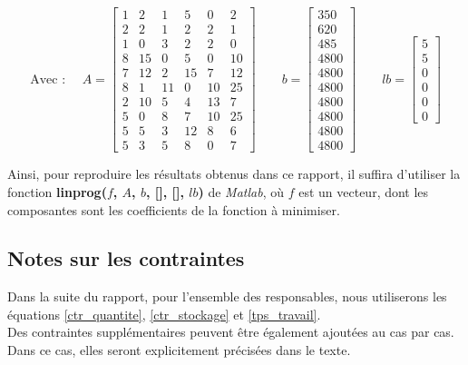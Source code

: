 \documentclass[paper=a4, fontsize=11pt]{report}
\numberwithin{equation}{section}		%
\numberwithin{figure}{section}			%
\numberwithin{table}{section}				%
\renewcommand{\bf}[1]{\textbf{#1}}
\begin{document}
\[ \text{Avec : } \quad A = \begin{bmatrix}
1 & 2 & 1 & 5 & 0 & 2 \\ 
2 & 2 & 1 & 2 & 2 & 1 \\ 
1 & 0 & 3 & 2 & 2 & 0 \\ 
8 & 15 & 0 & 5 & 0 & 10 \\ 
7 & 12 & 2 & 15 & 7 & 12 \\ 
8 & 1 & 11 & 0 & 10 & 25 \\ 
2 & 10 & 5 & 4 & 13 & 7 \\ 
5 & 0 & 8 & 7 & 10 & 25 \\ 
5 & 5 & 3 & 12 & 8 & 6 \\ 
5 & 3 & 5 & 8 & 0 & 7 
\end{bmatrix} \quad \quad
b = \begin{bmatrix}
350 \\ 
620 \\ 
485 \\ 
4800 \\ 
4800 \\ 
4800 \\ 
4800 \\ 
4800 \\ 
4800 \\ 
4800
\end{bmatrix} \quad \quad
lb = \begin{bmatrix}
5 \\
5 \\
0 \\
0 \\
0 \\
0
\end{bmatrix} 
  \]

Ainsi, pour reproduire les résultats obtenus dans ce rapport, il suffira d'utiliser la fonction \bf{linprog($f$, $A$, $b$, [], [], $lb$)} de \textit{Matlab}, où $f$ est un vecteur, dont les composantes sont les coefficients de la fonction à minimiser.

\begin{shaded}
\vspace{-0.5cm}

\subsection*{Notes sur les contraintes}
Dans la suite du rapport, pour l'ensemble des responsables, nous utiliserons les équations \eqref{ctr_quantite}, \eqref{ctr_stockage} et \eqref{tps_travail}. \\

Des contraintes supplémentaires peuvent être également ajoutées au cas par cas. Dans ce cas, elles seront explicitement précisées dans le texte.
\end{shaded}
\end{document}
